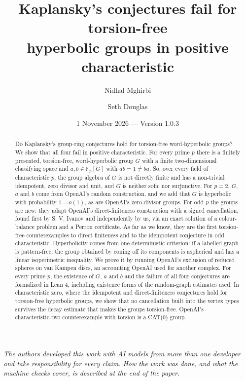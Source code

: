 \documentclass[11pt]{article}
\title{\vspace{-1.9cm}\Large\bfseries Kaplansky's conjectures fail for torsion-free\\ hyperbolic groups in positive characteristic\vspace{-0.3cm}}
\author{Nidhal Mghirbi \and Seth Douglas}
\date{\vspace{-0.3cm}1 November 2026 --- Version 1.0.3\vspace{-0.6cm}}
\theoremstyle{definition}
\theoremstyle{plain}
\newcommand{\F}{\mathbb{F}}
\begin{document}
\maketitle

\begin{abstract}
Do Kaplansky's group-ring conjectures hold for torsion-free word-hyperbolic groups? We show that all four fail in positive characteristic. For every prime $p$ there is a finitely presented, torsion-free, word-hyperbolic group $G$ with a finite two-dimensional classifying space and $a,b\in\F_p[G]$ with $ab=1\neq ba$. So, over every field of characteristic $p$, the group algebra of $G$ is not directly finite and has a non-trivial idempotent, zero divisor and unit, and $G$ is neither sofic nor surjunctive. For $p=2$, $G$, $a$ and $b$ come from OpenAI's random construction, and we add that $G$ is hyperbolic with probability $1-o(1)$, as are OpenAI's zero-divisor groups. For odd $p$ the groups are new: they adapt OpenAI's direct-finiteness construction with a signed cancellation, found first by S. V. Ivanov and independently by us, via an exact solution of a colour-balance problem and a Perron certificate. As far as we know, they are the first torsion-free counterexamples to direct finiteness and to the idempotent conjecture in odd characteristic. Hyperbolicity comes from one deterministic criterion: if a labelled graph is pattern-free, the group obtained by coning off its components is aspherical and has a linear isoperimetric inequality. We prove it by running OpenAI's exclusion of reduced spheres on van Kampen discs, an accounting OpenAI used for another complex. For every prime $p$, the existence of $G$, $a$ and $b$ and the failure of all four conjectures are formalized in Lean 4, including existence forms of the random-graph estimates used. In characteristic zero, where the idempotent and direct-finiteness conjectures hold for torsion-free hyperbolic groups, we show that no cancellation built into the vertex types survives the decay estimate that makes the groups torsion-free. OpenAI's characteristic-two counterexample with torsion is a CAT(0) group.
\end{abstract}

\noindent\emph{The authors developed this work with AI models from more than one developer and take responsibility for every claim. How the work was done, and what the machine checks cover, is described at the end of the paper.}

{\small\setcounter{tocdepth}{1}\tableofcontents}
\end{document}

